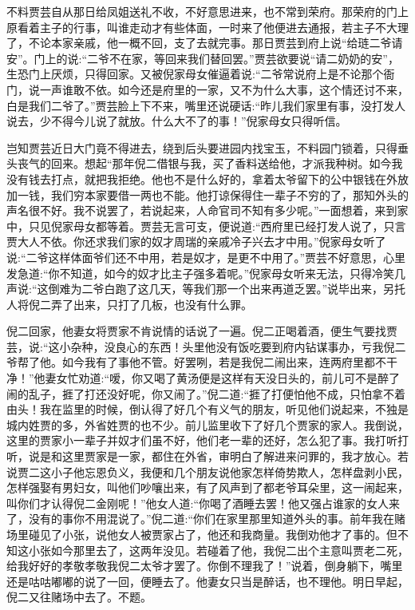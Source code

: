 \begin{parag}
    不料贾芸自从那日给凤姐送礼不收，不好意思进来，也不常到荣府。那荣府的门上原看着主子的行事，叫谁走动才有些体面，一时来了他便进去通报，若主子不大理了，不论本家亲戚，他一概不回，支了去就完事。那日贾芸到府上说“给琏二爷请安”。门上的说:“二爷不在家，等回来我们替回罢。”贾芸欲要说“请二奶奶的安”，生恐门上厌烦，只得回家。又被倪家母女催逼着说:“二爷常说府上是不论那个衙门，说一声谁敢不依。如今还是府里的一家，又不为什么大事，这个情还讨不来，白是我们二爷了。”贾芸脸上下不来，嘴里还说硬话:“昨儿我们家里有事，没打发人说去，少不得今儿说了就放。什么大不了的事！”倪家母女只得听信。
\end{parag}


\begin{parag}
    岂知贾芸近日大门竟不得进去，绕到后头要进园内找宝玉，不料园门锁着，只得垂头丧气的回来。想起“那年倪二借银与我，买了香料送给他，才派我种树。如今我没有钱去打点，就把我拒绝。他也不是什么好的，拿着太爷留下的公中银钱在外放加一钱，我们穷本家要借一两也不能。他打谅保得住一辈子不穷的了，那知外头的声名很不好。我不说罢了，若说起来，人命官司不知有多少呢。”一面想着，来到家中，只见倪家母女都等着。贾芸无言可支，便说道:“西府里已经打发人说了，只言贾大人不依。你还求我们家的奴才周瑞的亲戚冷子兴去才中用。”倪家母女听了说:“二爷这样体面爷们还不中用，若是奴才，是更不中用了。”贾芸不好意思，心里发急道:“你不知道，如今的奴才比主子强多着呢。”倪家母女听来无法，只得冷笑几声说:“这倒难为二爷白跑了这几天，等我们那一个出来再道乏罢。”说毕出来，另托人将倪二弄了出来，只打了几板，也没有什么罪。
\end{parag}


\begin{parag}
    倪二回家，他妻女将贾家不肯说情的话说了一遍。倪二正喝着酒，便生气要找贾芸，说:“这小杂种，没良心的东西！头里他没有饭吃要到府内钻谋事办，亏我倪二爷帮了他。如今我有了事他不管。好罢咧，若是我倪二闹出来，连两府里都不干净！”他妻女忙劝道:“嗳，你又喝了黄汤便是这样有天没日头的，前儿可不是醉了闹的乱子，捱了打还没好呢，你又闹了。”倪二道:“捱了打便怕他不成，只怕拿不着由头！我在监里的时候，倒认得了好几个有义气的朋友，听见他们说起来，不独是城内姓贾的多，外省姓贾的也不少。前儿监里收下了好几个贾家的家人。我倒说，这里的贾家小一辈子并奴才们虽不好，他们老一辈的还好，怎么犯了事。我打听打听，说是和这里贾家是一家，都住在外省，审明白了解进来问罪的，我才放心。若说贾二这小子他忘恩负义，我便和几个朋友说他家怎样倚势欺人，怎样盘剥小民，怎样强娶有男妇女，叫他们吵嚷出来，有了风声到了都老爷耳朵里，这一闹起来，叫你们才认得倪二金刚呢！”他女人道:“你喝了酒睡去罢！他又强占谁家的女人来了，没有的事你不用混说了。”倪二道:“你们在家里那里知道外头的事。前年我在赌场里碰见了小张，说他女人被贾家占了，他还和我商量。我倒劝他才了事的。但不知这小张如今那里去了，这两年没见。若碰着了他，我倪二出个主意叫贾老二死，给我好好的孝敬孝敬我倪二太爷才罢了。你倒不理我了！”说着，倒身躺下，嘴里还是咕咕嘟嘟的说了一回，便睡去了。他妻女只当是醉话，也不理他。明日早起，倪二又往赌场中去了。不题。
\end{parag}


